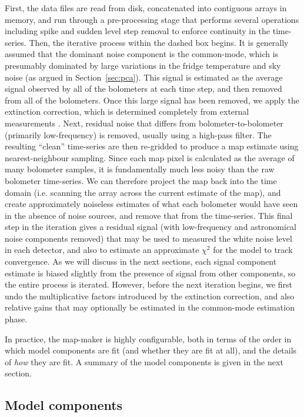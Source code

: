 \documentclass[useAMS,usenatbib,nofootinbib]{mn2e}
\begin{document}
First, the data files are read from disk, concatenated into contiguous
arrays in memory, and run through a pre-processing stage that performs
several operations including spike and sudden level step removal to
enforce continuity in the time-series. Then, the iterative process
within the dashed box begins. It is generally assumed that the
dominant noise component is the common-mode, which is presumably
dominated by large variations in the fridge temperature and sky noise
(as argued in Section~\ref{sec:pca}). This signal is estimated as the
average signal observed by all of the bolometers at each time step,
and then removed from all of the bolometers. Once this large signal
has been removed, we apply the extinction correction, which is
determined completely from external measurements
\citep[see][]{dempsey2012}. Next, residual noise that differs from
bolometer-to-bolometer (primarily low-frequency) is removed, usually
using a high-pass filter. The resulting ``clean'' time-series are then
re-gridded to produce a map estimate using nearest-neighbour
sampling. Since each map pixel is calculated as the average of many
bolometer samples, it is fundamentally much less noisy than the raw
bolometer time-series. We can therefore project the map back into the
time domain (i.e. scanning the array across the current estimate of
the map), and create approximately noiseless estimates of what each
bolometer would have seen in the absence of noise sources, and remove
that from the time-series. This final step in the iteration gives a
residual signal (with low-frequency and astronomical noise components
removed) that may be used to measured the white noise level in each
detector, and also to estimate an approximate $\chi^2$ for the model
to track convergence. As we will discuss in the next sections, each
signal component estimate is biased slightly from the presence of
signal from other components, so the entire process is
iterated. However, before the next iteration begins, we first undo the
multiplicative factors introduced by the extinction correction, and
also relative gains that may optionally be estimated in the
common-mode estimation phase.

In practice, the map-maker is highly configurable, both in terms of
the order in which model components are fit (and whether they are fit
at all), and the details of \emph{how} they are fit. A summary of the
model components is given in the next section.

\subsection{Model components}
\label{sec:components}
\end{document}
